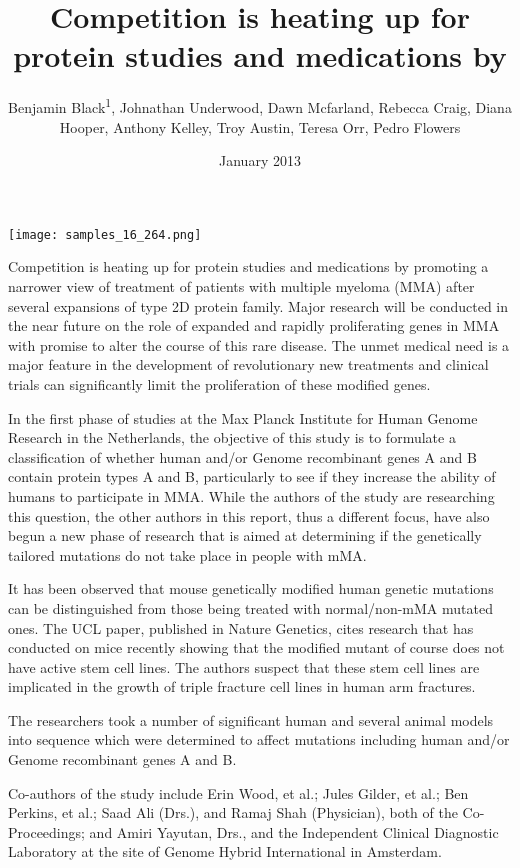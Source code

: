 \documentclass{article}
\title{Competition is heating up for protein studies and medications by}
\author{Benjamin Black\textsuperscript{1},  Johnathan Underwood,  Dawn Mcfarland,  Rebecca Craig,  Diana Hooper,  Anthony Kelley,  Troy Austin,  Teresa Orr,  Pedro Flowers}
\affil{\textsuperscript{1}Medical School of Southeast University}
\date{January 2013}
\begin{document}
\maketitle

\begin{center}
\begin{minipage}{0.75\linewidth}
\texttt{[image: samples\_16\_264.png]}
\end{minipage}
\end{center}

Competition is heating up for protein studies and medications by promoting a narrower view of treatment of patients with multiple myeloma (MMA) after several expansions of type 2D protein family. Major research will be conducted in the near future on the role of expanded and rapidly proliferating genes in MMA with promise to alter the course of this rare disease. The unmet medical need is a major feature in the development of revolutionary new treatments and clinical trials can significantly limit the proliferation of these modified genes.

In the first phase of studies at the Max Planck Institute for Human Genome Research in the Netherlands, the objective of this study is to formulate a classification of whether human and/or Genome recombinant genes A and B contain protein types A and B, particularly to see if they increase the ability of humans to participate in MMA. While the authors of the study are researching this question, the other authors in this report, thus a different focus, have also begun a new phase of research that is aimed at determining if the genetically tailored mutations do not take place in people with mMA.

It has been observed that mouse genetically modified human genetic mutations can be distinguished from those being treated with normal/non-mMA mutated ones. The UCL paper, published in Nature Genetics, cites research that has conducted on mice recently showing that the modified mutant of course does not have active stem cell lines. The authors suspect that these stem cell lines are implicated in the growth of triple fracture cell lines in human arm fractures.

The researchers took a number of significant human and several animal models into sequence which were determined to affect mutations including human and/or Genome recombinant genes A and B.

Co-authors of the study include Erin Wood, et al.; Jules Gilder, et al.; Ben Perkins, et al.; Saad Ali (Drs.), and Ramaj Shah (Physician), both of the Co-Proceedings; and Amiri Yayutan, Drs., and the Independent Clinical Diagnostic Laboratory at the site of Genome Hybrid International in Amsterdam.
\end{document}
